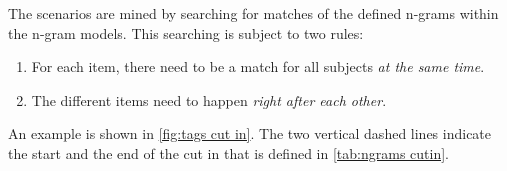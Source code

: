 The scenarios are mined by searching for matches of the defined n-grams within the n-gram models. 
This searching is subject to two rules:
\begin{enumerate}
	\item For each item, there need to be a match for all subjects \emph{at the same time}.
	\item The different items need to happen \emph{right after each other}. 
\end{enumerate}
An example is shown in \cref{fig:tags cut in}. 
The two vertical dashed lines indicate the start and the end of the cut in that is defined in \cref{tab:ngrams cutin}.
\cendb

\begin{figure*}
	\centering
	
	\caption{\cstartc Example of tags describing a cut in. Note that only the tags that are relevant for the cut in, as defined in \cref{tab:ngrams cutin}, are shown.\cendc}
	\label{fig:tags cut in}
\end{figure*}



